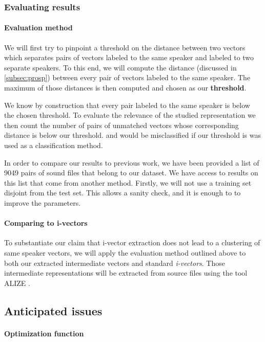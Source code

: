 \documentclass[conference]{IEEEtran}
\begin{document}
\subsubsection{Evaluating results}

\paragraph{Evaluation method}

We will first try to pinpoint a threshold on the distance
between two vectors which separates pairs of vectors labeled to the same speaker
and labeled to two separate speakers. To this end, we will compute the distance
(discussed in \ref{subsec:prosp}) between every pair of vectors labeled to the
same speaker. The maximum of those distances is then computed and chosen as our
\textbf{threshold}.

We know by construction that every pair labeled to the same speaker is below the
chosen threshold. To evaluate the relevance of the studied representation we
then count the number of pairs of unmatched vectors whose corresponding distance
is below our threshold. and would be misclassified if our threshold is was used
as a classification method.

In order to compare our results to previous work, we have been provided a list 
of 9049 pairs of sound files that belong to our dataset. We have access to results
on this list that come from another method. Firstly,  we will not use a training
set disjoint from the test set. This allows a sanity check, and it is enough to
to improve the parameters.

\paragraph{Comparing to i-vectors}

 To substantiate our claim that i-vector extraction does not lead to a
 clustering of same speaker vectors, we will apply the evaluation method
 outlined above to both our
 extracted intermediate vectors and standard \emph{i-vectors}. Those
 intermediate representations will be extracted from source files using the tool
 ALIZE \cite{larcher2013alize}.

\subsection{Anticipated issues}

\paragraph{Optimization function}
\end{document}
